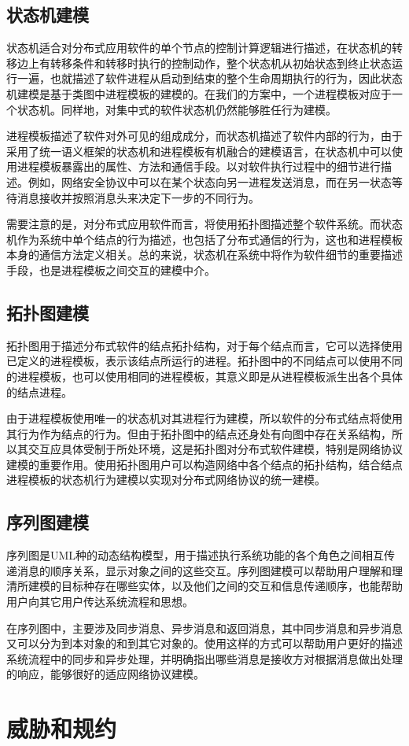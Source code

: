 \subsection{状态机建模}
状态机适合对分布式应用软件的单个节点的控制计算逻辑进行描述，在状态机的转移边上有转移条件和转移时执行的控制动作，整个状态机从初始状态到终止状态运行一遍，也就描述了软件进程从启动到结束的整个生命周期执行的行为，因此状态机建模是基于类图中进程模板的建模的。在我们的方案中，一个进程模板对应于一个状态机。同样地，对集中式的软件状态机仍然能够胜任行为建模。
\par
进程模板描述了软件对外可见的组成成分，而状态机描述了软件内部的行为，由于采用了统一语义框架的状态机和进程模板有机融合的建模语言，在状态机中可以使用进程模板暴露出的属性、方法和通信手段。以对软件执行过程中的细节进行描述。例如，网络安全协议中可以在某个状态向另一进程发送消息，而在另一状态等待消息接收并按照消息头来决定下一步的不同行为。
\par
需要注意的是，对分布式应用软件而言，将使用拓扑图描述整个软件系统。而状态机作为系统中单个结点的行为描述，也包括了分布式通信的行为，这也和进程模板本身的通信方法定义相关。总的来说，状态机在系统中将作为软件细节的重要描述手段，也是进程模板之间交互的建模中介。

\subsection{拓扑图建模}
拓扑图用于描述分布式软件的结点拓扑结构，对于每个结点而言，它可以选择使用已定义的进程模板，表示该结点所运行的进程。拓扑图中的不同结点可以使用不同的进程模板，也可以使用相同的进程模板，其意义即是从进程模板派生出各个具体的结点进程。
\par
由于进程模板使用唯一的状态机对其进程行为建模，所以软件的分布式结点将使用其行为作为结点的行为。但由于拓扑图中的结点还身处有向图中存在关系结构，所以其交互应具体受制于所处环境，这是拓扑图对分布式软件建模，特别是网络协议建模的重要作用。使用拓扑图用户可以构造网络中各个结点的拓扑结构，结合结点进程模板的状态机行为建模以实现对分布式网络协议的统一建模。

\subsection{序列图建模}
序列图是UML种的动态结构模型，用于描述执行系统功能的各个角色之间相互传递消息的顺序关系，显示对象之间的这些交互。序列图建模可以帮助用户理解和理清所建模的目标种存在哪些实体，以及他们之间的交互和信息传递顺序，也能帮助用户向其它用户传达系统流程和思想。
\par
在序列图中，主要涉及同步消息、异步消息和返回消息，其中同步消息和异步消息又可以分为到本对象的和到其它对象的。使用这样的方式可以帮助用户更好的描述系统流程中的同步和异步处理，并明确指出哪些消息是接收方对根据消息做出处理的响应，能够很好的适应网络协议建模。


\section{威胁和规约}